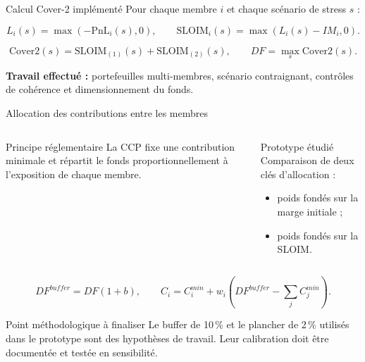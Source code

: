 \documentclass[10pt,aspectratio=169]{beamer}
\newcommand{\keyword}[1]{\textcolor{AccentBlue}{\textbf{#1}}}
\begin{document}
\begin{frame}{Calcul Cover-2 implémenté}
  Pour chaque membre $i$ et chaque scénario de stress $s$ :

  \[
    L_i(s)=\max\!\left(-\mathrm{PnL}_i(s),0\right),
    \qquad
    \mathrm{SLOIM}_i(s)=\max\!\left(L_i(s)-IM_i,0\right).
  \]

  \[
    \mathrm{Cover2}(s)
      =\mathrm{SLOIM}_{(1)}(s)+\mathrm{SLOIM}_{(2)}(s),
    \qquad
    DF=\max_s \mathrm{Cover2}(s).
  \]

  \vspace{0.25cm}
  \centering

  \vspace{0.35cm}
  \keyword{Travail effectué :} portefeuilles multi-membres, scénario
  contraignant, contrôles de cohérence et dimensionnement du fonds.
\end{frame}

\begin{frame}{Allocation des contributions entre les membres}
  \begin{columns}[T,onlytextwidth]
    \begin{block}{Principe réglementaire}
      La CCP fixe une contribution minimale et répartit le fonds
      proportionnellement à l'exposition de chaque membre.
    \end{block}

    \begin{block}{Prototype étudié}
      Comparaison de deux clés d'allocation :
      \begin{itemize}
        \item poids fondés sur la marge initiale ;
        \item poids fondés sur la SLOIM.
      \end{itemize}
    \end{block}
  \end{columns}

  \[
    DF^{buffer}=DF(1+b),
    \qquad
    C_i=C_i^{min}
      +w_i\left(DF^{buffer}-\sum_j C_j^{min}\right).
  \]

  \begin{alertblock}{Point méthodologique à finaliser}
    Le buffer de 10\,\% et le plancher de 2\,\% utilisés dans le prototype
    sont des hypothèses de travail. Leur calibration doit être documentée
    et testée en sensibilité.
  \end{alertblock}
\end{frame}
\end{document}
